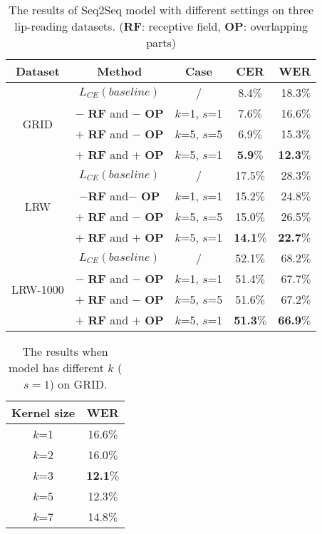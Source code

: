 \documentclass[a4paper, 10pt, conference]{ieeeconf}      %
\begin{document}
\begin{table}[H]
	\caption{The results of Seq2Seq model with different settings on three lip-reading datasets. (\textbf{RF}: receptive field, \textbf{OP}: overlapping parts)}
	\label{table1}
	\begin{center}
		\begin{tabular}{|c||c|c||c|r|}    
			\hline
			Dataset & Method& Case& CER &  WER \\
			\hline
			\hline
			\multirow{4}{*}{GRID}&    $L_{CE} (baseline)$ & / &8.4$\%$ & 18.3$\%$ \\
			~&    $-$ \textbf{RF} and $-$ \textbf{OP}&$k$=1, $s$=1& 7.6$\%$ & 16.6$\%$\\
			~&    $+$ \textbf{RF} and $-$ \textbf{OP}&$k$=5, $s$=5& 6.9$\%$ & 15.3$\%$ \\
			~    &$+$ \textbf{RF} and $+$ \textbf{OP} &$k$=5, $s$=1& \textbf{5.9}$\%$ & \textbf{12.3}$\%$ \\
			\hline
			\multirow{4}{*}{LRW}&$L_{CE} (baseline)$ & /&17.5$\%$ & 28.3$\%$  \\
			~& $-$\textbf{RF} and$-$ \textbf{OP}&$k$=1, $s$=1& 15.2$\%$ & 24.8$\%$ \\
			~&$+$ \textbf{RF} and $-$ \textbf{OP}&$k$=5, $s$=5& 15.0$\%$ & 26.5$\%$ \\
			~&$+$ \textbf{RF} and $+$ \textbf{OP} &$k$=5, $s$=1& \textbf{14.1}$\%$ & \textbf{22.7}$\%$ \\
			\hline
			\multirow{4}{*}{LRW-1000}&$L_{CE} (baseline)$             &/  & 52.1$\%$ & 68.2$\%$     \\
			~&$-$ \textbf{RF} and $-$ \textbf{OP} &$k$=1, $s$=1& 51.4$\%$ & 67.7$\%$    \\
			~&$+$ \textbf{RF} and $-$ \textbf{OP} & $k$=5, $s$=5& 51.6$\%$   &   67.2$\%$      \\
			~&$+$ \textbf{RF} and $+$ \textbf{OP} &$k$=5, $s$=1& \textbf{51.3}$\%$ & \textbf{66.9}$\%$      \\
			\hline
		\end{tabular}
	\end{center}
\end{table}
\vspace{-0.6cm}
\begin{table}[H] 
	\caption{The results when model has different $k$ ($s=1$) on GRID.} \label{table2}	
	\centering
	\begin{tabular}{|c||c|}    
		\hline
		Kernel size\centering      &     WER   \\
		\hline
		\hline
		$k$=1& 16.6$\%$\\
		$k$=2 &16.0$\%$ \\
		$k$=3&\textbf{12.1}$\%$ \\
		$k$=5 & 12.3$\%$ \\  
		$k$=7&14.8$\%$ \\
		\hline
	\end{tabular}	
\end{table}
\vspace{-0.4cm}
\end{document}
